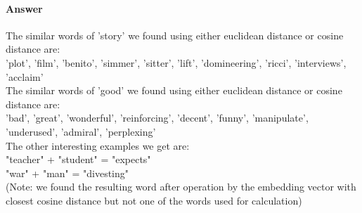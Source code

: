 \documentclass[11pt,twoside]{article}
\begin{document}
\paragraph{Answer}
The similar words of 'story' we found using either euclidean distance or cosine distance are:\\
'plot', 'film', 'benito', 'simmer', 'sitter', 'lift', 'domineering', 'ricci', 'interviews', 'acclaim'\\
The similar words of 'good' we found using either euclidean distance or cosine distance are:\\
'bad', 'great', 'wonderful', 'reinforcing', 'decent', 'funny', 'manipulate', 'underused', 'admiral', 'perplexing'\\
The other interesting examples we get are:\\
"teacher" + "student" = "expects"\\
"war" + "man" = "divesting"\\
(Note: we found the resulting word after operation by the embedding vector with closest cosine distance but not one of the words used for calculation)
\clearpage
\end{document}
